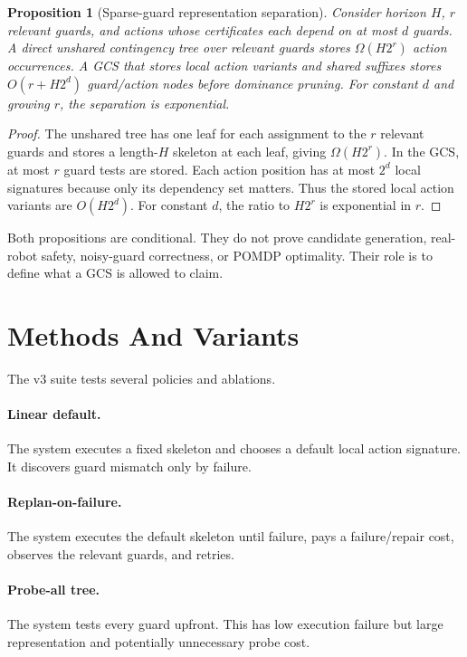 \documentclass{article}
\newtheorem{proposition}{Proposition}
\begin{document}
\begin{proposition}[Sparse-guard representation separation]
Consider horizon $H$, $r$ relevant guards, and actions whose certificates each depend on at most $d$ guards. A direct unshared contingency tree over relevant guards stores $\Omega(H2^r)$ action occurrences. A GCS that stores local action variants and shared suffixes stores $O(r+H2^d)$ guard/action nodes before dominance pruning. For constant $d$ and growing $r$, the separation is exponential.
\end{proposition}

\begin{proof}
The unshared tree has one leaf for each assignment to the $r$ relevant guards and stores a length-$H$ skeleton at each leaf, giving $\Omega(H2^r)$. In the GCS, at most $r$ guard tests are stored. Each action position has at most $2^d$ local signatures because only its dependency set matters. Thus the stored local action variants are $O(H2^d)$. For constant $d$, the ratio to $H2^r$ is exponential in $r$.
\end{proof}

Both propositions are conditional. They do not prove candidate generation, real-robot safety, noisy-guard correctness, or POMDP optimality. Their role is to define what a GCS is allowed to claim.

\section{Methods And Variants}
The v3 suite tests several policies and ablations.

\paragraph{Linear default.}
The system executes a fixed skeleton and chooses a default local action signature. It discovers guard mismatch only by failure.

\paragraph{Replan-on-failure.}
The system executes the default skeleton until failure, pays a failure/repair cost, observes the relevant guards, and retries.

\paragraph{Probe-all tree.}
The system tests every guard upfront. This has low execution failure but large representation and potentially unnecessary probe cost.
\end{document}
